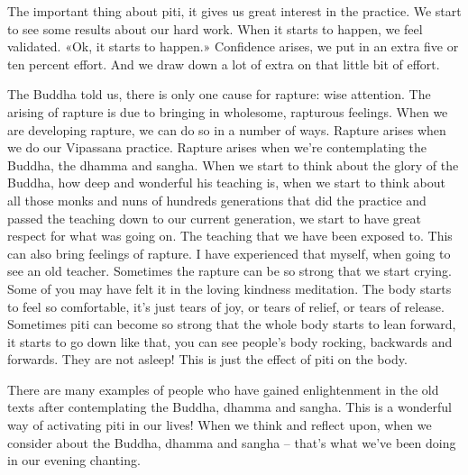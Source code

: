 \documentclass[letterpaper,10pt,english]{sphinxmanual}
\begin{document}
\sphinxAtStartPar
The important thing about piti, it gives us great interest in the practice.
We start to see some results about our hard work. When it starts to happen,
we feel validated. «Ok, it starts to happen.» Confidence arises, we put in an
extra five or ten percent effort. And we draw down a lot of extra on that little
bit of effort.

\sphinxAtStartPar
The Buddha told us, there is only one cause for rapture: wise attention.
The arising of rapture is due to bringing in wholesome, rapturous feelings.
When we are developing rapture, we can do so in a number of ways. Rapture arises when we do our Vipassana practice. Rapture arises when we’re
contemplating the Buddha, the dhamma and sangha. When we start to think
about  the  glory  of  the  Buddha,  how  deep  and  wonderful  his  teaching  is,
when we start to think about all those monks and nuns of hundreds generations that did the practice and passed the teaching down to our current generation, we start to have great respect for what was going on. The teaching
  that we have been exposed to. This can also bring feelings of rapture. I have
experienced that myself, when going to see an old teacher. Sometimes the
rapture can be so strong that we start crying. Some of you may have felt it
in  the  loving  kindness  meditation. The  body  starts  to  feel  so  comfortable,
it’s just tears of joy, or tears of relief, or tears of release. Sometimes piti can
become so strong that the whole body starts to lean forward, it starts to go
down like that, you can see people’s body rocking, backwards and forwards.
They are not asleep! This is just the effect of piti on the body.

\sphinxAtStartPar
There  are  many  examples  of  people  who  have  gained  enlightenment
in the old texts after contemplating the Buddha, dhamma and sangha. This
is a wonderful way of activating piti in our lives! When we think and reflect
upon,  when  we  consider  about  the  Buddha,  dhamma  and  sangha  –  that’s
what we’ve been doing in our evening chanting.
\end{document}
